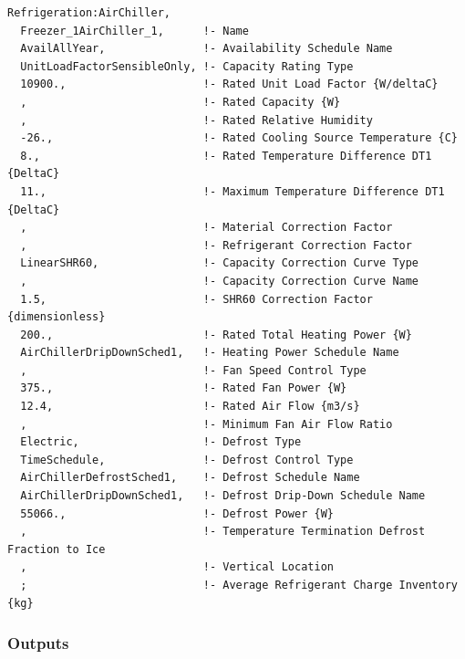 \begin{lstlisting}
Refrigeration:AirChiller,
  Freezer_1AirChiller_1,      !- Name
  AvailAllYear,               !- Availability Schedule Name
  UnitLoadFactorSensibleOnly, !- Capacity Rating Type
  10900.,                     !- Rated Unit Load Factor {W/deltaC}
  ,                           !- Rated Capacity {W}
  ,                           !- Rated Relative Humidity
  -26.,                       !- Rated Cooling Source Temperature {C}
  8.,                         !- Rated Temperature Difference DT1 {DeltaC}
  11.,                        !- Maximum Temperature Difference DT1 {DeltaC}
  ,                           !- Material Correction Factor
  ,                           !- Refrigerant Correction Factor
  LinearSHR60,                !- Capacity Correction Curve Type
  ,                           !- Capacity Correction Curve Name
  1.5,                        !- SHR60 Correction Factor {dimensionless}
  200.,                       !- Rated Total Heating Power {W}
  AirChillerDripDownSched1,   !- Heating Power Schedule Name
  ,                           !- Fan Speed Control Type
  375.,                       !- Rated Fan Power {W}
  12.4,                       !- Rated Air Flow {m3/s}
  ,                           !- Minimum Fan Air Flow Ratio
  Electric,                   !- Defrost Type
  TimeSchedule,               !- Defrost Control Type
  AirChillerDefrostSched1,    !- Defrost Schedule Name
  AirChillerDripDownSched1,   !- Defrost Drip-Down Schedule Name
  55066.,                     !- Defrost Power {W}
  ,                           !- Temperature Termination Defrost Fraction to Ice
  ,                           !- Vertical Location
  ;                           !- Average Refrigerant Charge Inventory {kg}
\end{lstlisting}

\subsubsection{Outputs}\label{outputs-12-005}

